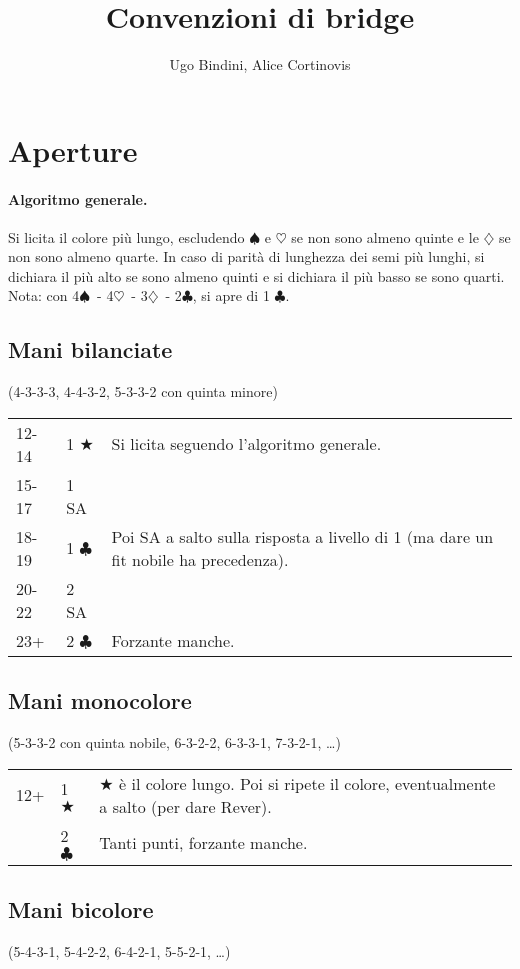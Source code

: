 \documentclass[a4paper,10pt]{article}
\title{Convenzioni di bridge}
\author{Ugo Bindini, Alice Cortinovis}
\renewcommand{\c}{$\clubsuit$\xspace}
\renewcommand{\d}{$\diamondsuit$\xspace}
\newcommand{\h}{$\heartsuit$\xspace}
\newcommand{\s}{$\spadesuit$\xspace}
\renewcommand{\j}{$\bigstar$\xspace}
\newcommand{\sa}{SA\xspace}
\newcommand{\smallspace}{\vskip0.3cm}
\newenvironment{threecol}
  {\smallspace\noindent\begin{tabular}{l l p{0.78\textwidth}}}
  {\end{tabular}\smallspace}
\begin{document}
\maketitle

\tableofcontents

\pagebreak
\section{Aperture}

\paragraph{Algoritmo generale.}
Si licita il colore più lungo, escludendo \s e \h se non sono almeno quinte e le \d se non sono almeno quarte.
In caso di parità di lunghezza dei semi più lunghi, si dichiara il più alto se sono almeno quinti e si dichiara il più basso se sono quarti.
Nota: con 4\s\ - 4\h\ - 3\d\ - 2\c, si apre di 1 \c.

\subsection{Mani bilanciate}
(4-3-3-3, 4-4-3-2, 5-3-3-2 con quinta minore)
\smallspace

\begin{threecol}
 12-14 & 1 \j & Si licita seguendo l'algoritmo generale. \\
 15-17 & 1 \sa & \\
 18-19 & 1 \c & Poi \sa a salto sulla risposta a livello di 1 (ma dare un fit nobile ha precedenza). \\
 20-22 & 2 \sa & \\
 23+ & 2 \c & Forzante manche. \\
\end{threecol}


\subsection{Mani monocolore}
(5-3-3-2 con quinta nobile, 6-3-2-2, 6-3-3-1, 7-3-2-1, \dots)

\begin{threecol}
 12+ & 1 \j & \j è il colore lungo. Poi si ripete il colore, eventualmente a salto (per dare Rever).\\
 & 2 \c & Tanti punti, forzante manche.
\end{threecol}


\subsection{Mani bicolore}
(5-4-3-1, 5-4-2-2, 6-4-2-1, 5-5-2-1, \dots)
\end{document}
